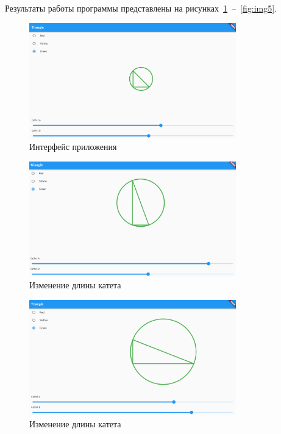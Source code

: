 \documentclass[a4paper, 14pt]{extarticle}
\begin{document}
Результаты работы программы представлены на рисунках~\ref{fig:img1}~--~\ref{fig:img5}. 

\begin{figure}[!htb]
	\centering
	\includegraphics[width=0.8\textwidth]{img1}
\caption{Интерфейс приложения}
\label{fig:img1}
\end{figure}

\begin{figure}[!htb]
	\centering
	\includegraphics[width=0.8\textwidth]{img2}
\caption{Изменение длины катета}
\label{fig:img2}
\end{figure}

\begin{figure}[!htb]
	\centering
	\includegraphics[width=0.8\textwidth]{img3}
\caption{Изменение длины катета}
\label{fig:img3}
\end{figure}
\end{document}
